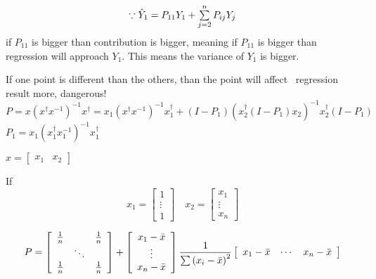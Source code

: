 \documentclass{article}
\begin{document}
\bigskip

\begin{equation*}
\because \hat{Y}_{1}=P_{11}Y_{1}+\mathop{\textstyle \sum }\limits_{j=2}^{n}P_{ij}Y_{j}
\end{equation*}%
if $P_{11}$ is bigger than contribution is bigger, meaning if $P_{11}$ is
bigger than regression will approach $Y_{1}$. This means the variance of $%
Y_{1}$ is bigger.

If one point is different than the others, than the point will affect \
regression result more, dangerous!%
\begin{equation*}
P=x\left( x^{\dagger }x^{-1}\right) ^{-1}x^{\dagger }=x_{1}\left( x^{\dagger
}x^{-1}\right) ^{-1}x_{1}^{\dagger }+\left( I-P_{1}\right) \left(
x_{2}^{\dagger }\left( I-P_{1}\right) x_{2}\right) ^{-1}x_{2}^{\dagger
}\left( I-P_{1}\right)
\end{equation*}%
$P_{1}=x_{1}\left( x_{1}^{\dagger }x_{1}^{-1}\right) ^{-1}x_{1}^{\dagger }$

\bigskip

$x=\left[ 
\begin{array}{cc}
x_{1} & x_{2}%
\end{array}%
\right] $

If%
\begin{equation*}
x_{1}=\left[ 
\begin{array}{c}
1 \\ 
\vdots  \\ 
1%
\end{array}%
\right] \quad x_{2}=\left[ 
\begin{array}{c}
x_{1} \\ 
\vdots  \\ 
x_{n}%
\end{array}%
\right] 
\end{equation*}

\begin{equation*}
P=\left[ 
\begin{array}{ccc}
\frac{1}{n} &  & \frac{1}{n} \\ 
& \ddots &  \\ 
\frac{1}{n} &  & \frac{1}{n}%
\end{array}%
\right] +\left[ 
\begin{array}{c}
x_{1}-\bar{x} \\ 
\vdots \\ 
x_{n}-\bar{x}%
\end{array}%
\right] \frac{1}{\tsum \left( x_{i}-\bar{x}\right) ^{2}}\left[ 
\begin{array}{ccc}
x_{1}-\bar{x} & \cdots & x_{n}-\bar{x}%
\end{array}%
\right]
\end{equation*}
\end{document}
